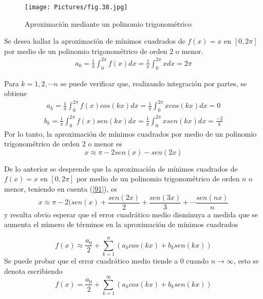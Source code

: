\bigskip

\begin{figure}
    \centering
    \texttt{[image: Pictures/fig.38.jpg]}
    \caption{Aproximación mediante un polinomio trigonométrico}
    \label{Fourier1}
\end{figure} 

\bigskip

 \begin{example}
 
 Se desea hallar la aproximación de mínimos cuadrados de $f(x)=x$  en $[0, 2 \pi]$ por medio de un polinomio trigonométrico de orden $2$ o menor.
 \begin{eqnarray}
 a_0= \frac{1}{\pi} \int_0^{2\pi} f(x)dx = \frac{1}{\pi} \int_0^{2\pi} x dx =2 \pi
 \label{90}
 \end{eqnarray}
 
 Para $k=1, 2,\cdots n $ se puede verificar que, realizando integración por partes, se obtiene
 \begin{eqnarray*}
 a_k= \frac{1}{\pi} \int_0^{2\pi} f(x)cos(kx)dx = \frac{1}{\pi} \int_0^{2\pi} x cos(kx)dx =0
 \label{91}
 \end{eqnarray*}
  \begin{eqnarray*}
 b_k= \frac{1}{\pi} \int_0^{2\pi} f(x)sen(kx)dx = \frac{1}{\pi} \int_0^{2\pi} x sen(kx)dx =\frac{-2}{k}
 \label{92}
 \end{eqnarray*}
 Por lo tanto, la aproximación de mínimos cuadrados  por medio de un polinomio trigonométrico de orden $2$ o menor es
 \[
 x \approx  \pi -2 sen(x) - sen(2x)
 \]
 \end{example}
 De lo anterior se desprende que  la aproximación de mínimos cuadrados de $f(x)=x$  en $[0, 2 \pi]$ por medio de un polinomio trigonométrico de orden $n$ o menor, teniendo en cuenta (\ref{91}), es
 \[
 x \approx  \pi -2 (sen(x) + \frac{sen(2x)}{2} + \frac{sen(3x)}{3}  + \cdots \frac{sen(nx)}{n}
 \] 
 y resulta obvio esperar que el error cuadrático medio disminuya a medida que se aumenta el número de términos en la aproximación de mínimos cuadrados
 
 \[
 f(x) \approx  \frac{a_0}{2}+ \sum_{k=1}^n (a_k cos(kx) + b_k sen(kx) ) \]
 Se puede probar que el error cuadrático medio tiende a $0$ cuando $n \rightarrow \infty$, esto se denota escribiendo
 \begin{equation}
   f(x) =  \frac{a_0}{2}+ \sum_{k=1}^\infty (a_k cos(kx) + b_k sen(kx) )  
   \label{95} 
 \end{equation}
 
